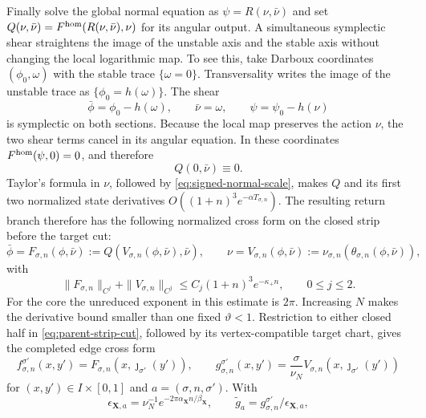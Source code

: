 \documentclass[11pt]{amsart}
\numberwithin{equation}{section}
\theoremstyle{definition}
\theoremstyle{remark}
\begin{document}
Finally solve the global normal equation as
$\psi=R(\nu,\bar\nu)$ and set
$Q(\nu,\bar\nu)=F^{\rm hom}(R(\nu,\bar\nu),\nu)$ for its angular output.
A simultaneous symplectic shear straightens the image of the unstable
axis and the stable axis without changing the local logarithmic map.  To
see this, take Darboux coordinates $(\phi_0,\omega)$ with the stable trace
$\{\omega=0\}$.  Transversality writes the image of the unstable trace as
$\{\phi_0=h(\omega)\}$.  The shear
\begin{equation}\label{eq:simultaneous-section-shear}
 \bar\phi=\phi_0-h(\omega),\qquad \bar\nu=\omega,
 \qquad \psi=\psi_0-h(\nu)
\end{equation}
is symplectic on both sections.  Because the local map preserves the action
$\nu$, the two shear terms cancel in its angular equation.  In these
coordinates $F^{\rm hom}(\psi,0)=0$, and therefore
\begin{equation}\label{eq:global-cross-axis}
 Q(0,\bar\nu)\equiv0.
\end{equation}
Taylor's formula in $\nu$, followed by
\eqref{eq:signed-normal-scale}, makes $Q$ and its first two normalized
state derivatives $O((1+n)^3e^{-\alpha T_{\sigma,n}})$.  The resulting return branch
therefore has the following normalized cross form on the closed strip
before the target cut:
\begin{equation}\label{eq:core-cross-rate}
 \bar\phi=F_{\sigma,n}(\phi,\bar\nu)
   :=Q(V_{\sigma,n}(\phi,\bar\nu),\bar\nu),
 \qquad
 \nu=V_{\sigma,n}(\phi,\bar\nu)
   :=\nu_{\sigma,n}(\theta_{\sigma,n}(\phi,\bar\nu)),
\end{equation}
with
\begin{equation}\label{eq:core-cross-estimate}
 \|F_{\sigma,n}\|_{C^j}+\|V_{\sigma,n}\|_{C^j}
 \le C_j(1+n)^3e^{-\kappa_+ n},
 \qquad 0\le j\le2.
\end{equation}
For the core the unreduced exponent in this estimate is $2\pi$.
Increasing $N$ makes the derivative bound smaller than one fixed
$\vartheta<1$.  Restriction to either closed half in
\eqref{eq:parent-strip-cut}, followed by its vertex-compatible target chart,
gives the completed edge cross form
\begin{equation}\label{eq:half-edge-cross-forms}
 f_{\sigma,n}^{\sigma'}(x,y')
   =F_{\sigma,n}(x,\jmath_{\sigma'}(y')),\qquad
 g_{\sigma,n}^{\sigma'}(x,y')
   =\frac{\sigma}{\nu_N}
      V_{\sigma,n}(x,\jmath_{\sigma'}(y'))
\end{equation}
for $(x,y')\in I\times[0,1]$ and $a=(\sigma,n,\sigma')$.  With
\begin{equation}\label{eq:branch-seam-scale}
 \epsilon_{\mathbf X,a}=\nu_N^{-1}
   e^{-2\pi\alpha_{\mathbf X}n/\beta_{\mathbf X}},
 \qquad
 \widetilde g_a=g_{\sigma,n}^{\sigma'}/\epsilon_{\mathbf X,a},
\end{equation}
\end{document}
